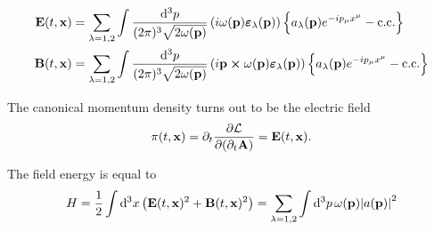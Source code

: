 \begin{theorem}
	\begin{align}
		\vb{E}(t,\vb{x})
		&=
		\sum_{\lambda=1,2}
		\int\frac{\dd[3]{p}}{(2\pi)^3\sqrt{2\omega(\vb{p})}}
		\left(
			i\omega(\vb{p})
			\boldsymbol{\varepsilon}_\lambda(\vb{p})
		\right)
		\left\{
			a_\lambda(\vb{p})
			e^{-ip_\mu x^\mu}
			-
			\text{c.c.}
		\right\}
		\\
		\vb{B}(t,\vb{x})
		&=
		\sum_{\lambda=1,2}
		\int\frac{\dd[3]{p}}{(2\pi)^3\sqrt{2\omega(\vb{p})}}
		\left(
			i\vb{p}\cross\omega(\vb{p})
			\boldsymbol{\varepsilon}_\lambda(\vb{p})
		\right)
		\left\{
			a_\lambda(\vb{p})
			e^{-ip_\mu x^\mu}
			-
			\text{c.c.}
		\right\}
	\end{align}
\end{theorem}
\begin{lemma}
	The canonical momentum density turns out to be the electric field
	\begin{equation}
		\pi(t,\vb{x})
		=
		\partial_t\pdv{\mathcal{L}}{(\partial_t\vb{A})}
		=
		\vb{E}(t,\vb{x})
		\label{eq:mw_mom}.
	\end{equation}
\end{lemma}
\begin{lemma}\label{thm:mw_energy}
	The field energy is equal to
	\begin{equation}
		H
		=
		\frac{1}{2}
		\int\dd[3]{x}
		\left(
			\vb{E}(t,\vb{x})^2
			+
			\vb{B}(t,\vb{x})^2
		\right)
		=
		\sum_{\lambda=1,2}
		\int\dd[3]{p}
		\omega(\vb{p})
		\abs{a(\vb{p})}^2
	\end{equation}
\end{lemma}
